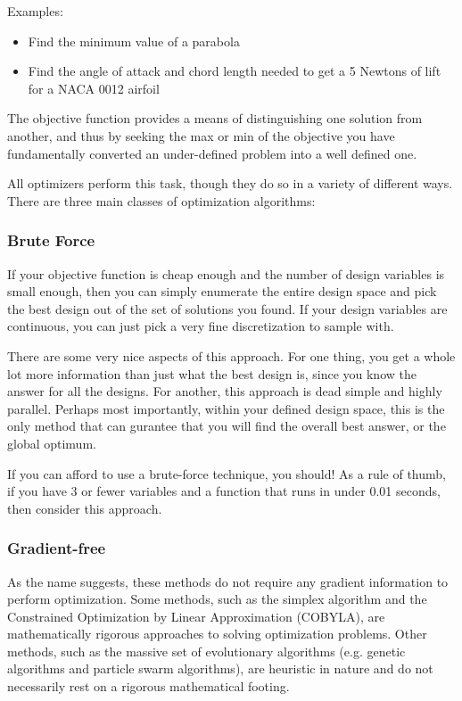 \documentclass[conf]{new-aiaa}
\begin{document}
        Examples: 
        \begin{itemize}
            \item Find the minimum value of a parabola
            \item Find the angle of attack and chord length needed to get a 5 Newtons of lift for a NACA 0012 airfoil
        \end{itemize}

        The objective function provides a means of distinguishing one solution from another, 
        and thus by seeking the max or min of the objective you have fundamentally converted an under-defined problem into a well defined one. 

        All optimizers perform this task, though they do so in a variety of different ways. 
        There are three main classes of optimization algorithms: 
        
        \subsubsection{Brute Force}
            If your objective function is cheap enough and the number of design variables is small enough, then you can simply enumerate the entire design space and pick the best design out of the set of solutions you found. 
            If your design variables are continuous, you can just pick a very fine discretization to sample with. 

            There are some very nice aspects of this approach. For one thing, you get a whole lot more information than just what the best design is, since you know the answer for all the designs. 
            For another, this approach is dead simple and highly parallel. 
            Perhaps most importantly, within your defined design space, this is the only method that can gurantee that you will find the overall best answer, or the global optimum. 

            If you can afford to use a brute-force technique, you should! As a rule of thumb, if you have 3 or fewer variables and a function that runs in under 0.01 seconds, then consider this approach. 

        \subsubsection{Gradient-free}
            As the name suggests, these methods do not require any gradient information to perform optimization.
            Some methods, such as the simplex algorithm and the Constrained Optimization by Linear Approximation (COBYLA), are mathematically rigorous approaches to solving optimization problems. 
            Other methods, such as the massive set of evolutionary algorithms (e.g. genetic algorithms and particle swarm algorithms), are heuristic in nature and do not necessarily rest on a rigorous mathematical footing. 
\end{document}

